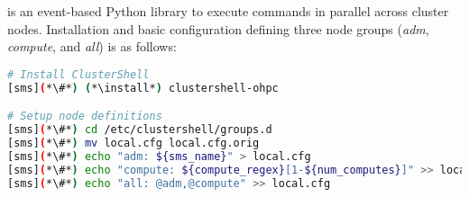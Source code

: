 \clustershell{} is an event-based Python library to execute commands in parallel
across cluster nodes. Installation and basic configuration defining three node
groups ({\em adm}, {\em compute}, and {\em all}) is as follows:

\begin{lstlisting}[language=bash,keywords={},upquote=true]
# Install ClusterShell
[sms](*\#*) (*\install*) clustershell-ohpc

# Setup node definitions
[sms](*\#*) cd /etc/clustershell/groups.d
[sms](*\#*) mv local.cfg local.cfg.orig
[sms](*\#*) echo "adm: ${sms_name}" > local.cfg
[sms](*\#*) echo "compute: ${compute_regex}[1-${num_computes}]" >> local.cfg
[sms](*\#*) echo "all: @adm,@compute" >> local.cfg
\end{lstlisting}

